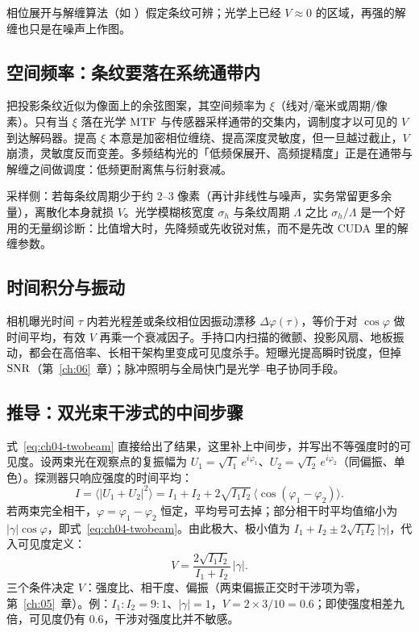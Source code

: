 相位展开与解缠算法（如 \cite{GhigliaPritt1998}）假定条纹可辨；光学上已经 $V\approx0$ 的区域，再强的解缠也只是在噪声上作图。


\subsection{空间频率：条纹要落在系统通带内}

把投影条纹近似为像面上的余弦图案，其空间频率为 $\xi$（线对/毫米或周期/像素）。只有当 $\xi$ 落在光学 $\mathrm{MTF}$ 与传感器采样通带的交集内，调制度才以可见的 $V$ 到达解码器。提高 $\xi$ 本意是加密相位缠绕、提高深度灵敏度，但一旦越过截止，$V$ 崩溃，灵敏度反而变差。多频结构光的「低频保展开、高频提精度」正是在通带与解缠之间做调度：低频更耐离焦与衍射衰减。

采样侧：若每条纹周期少于约 $2$--$3$ 像素（再计非线性与噪声，实务常留更多余量），离散化本身就损 $V$。光学模糊核宽度 $\sigma_{h}$ 与条纹周期 $\Lambda$ 之比 $\sigma_{h}/\Lambda$ 是一个好用的无量纲诊断：比值增大时，先降频或先收锐对焦，而不是先改 CUDA 里的解缠参数。

\subsection{时间积分与振动}

相机曝光时间 $\tau$ 内若光程差或条纹相位因振动漂移 $\Delta\varphi(\tau)$，等价于对 $\cos\varphi$ 做时间平均，有效 $V$ 再乘一个衰减因子。手持口内扫描的微颤、投影风扇、地板振动，都会在高倍率、长相干架构里变成可见度杀手。短曝光提高瞬时锐度，但掉 $\mathrm{SNR}$（第~\ref{ch:06}~章）；脉冲照明与全局快门是光学–电子协同手段。

\subsection{推导：双光束干涉式的中间步骤}

式~\eqref{eq:ch04-twobeam} 直接给出了结果，这里补上中间步，并写出不等强度时的可见度。设两束光在观察点的复振幅为 $U_1=\sqrt{I_1}\,e^{i\varphi_1}$、$U_2=\sqrt{I_2}\,e^{i\varphi_2}$（同偏振、单色）。探测器只响应强度的时间平均：
\[
  I=\langle|U_1+U_2|^2\rangle=I_1+I_2+2\sqrt{I_1I_2}\,\langle\cos(\varphi_1-\varphi_2)\rangle .
\]
若两束完全相干，$\varphi=\varphi_1-\varphi_2$ 恒定，平均号可去掉；部分相干时平均值缩小为 $|\gamma|\cos\varphi$，即式~\eqref{eq:ch04-twobeam}。由此极大、极小值为 $I_1+I_2\pm2\sqrt{I_1I_2}|\gamma|$，代入可见度定义：
\begin{equation}
  V=\frac{2\sqrt{I_1I_2}}{I_1+I_2}\,|\gamma| .
  \label{eq:ch04-visibility-unequal}
\end{equation}
三个条件决定 $V$：强度比、相干度、偏振（两束偏振正交时干涉项为零，第~\ref{ch:05}~章）。例：$I_1:I_2=9:1$、$|\gamma|=1$，$V=2\times3/10=0.6$；即使强度相差九倍，可见度仍有 $0.6$，干涉对强度比并不敏感。

